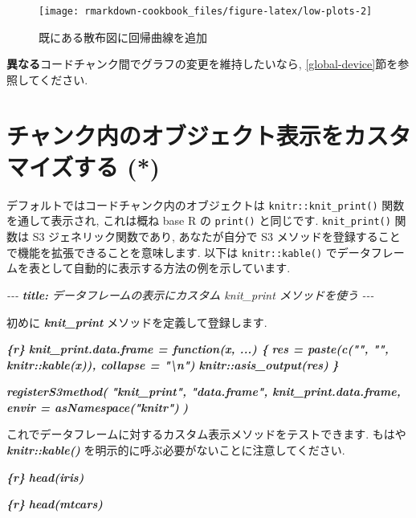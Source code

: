 \documentclass[
  11pt,
]{bxjsreport}
\newenvironment{Shaded}{\begin{snugshade}}{\end{snugshade}}
\newcommand{\AnnotationTok}[1]{\textcolor[rgb]{0.56,0.35,0.01}{\textbf{\textit{#1}}}}
\newcommand{\CommentTok}[1]{\textcolor[rgb]{0.56,0.35,0.01}{\textit{#1}}}
\newcommand{\InformationTok}[1]{\textcolor[rgb]{0.56,0.35,0.01}{\textbf{\textit{#1}}}}
\newcommand{\NormalTok}[1]{#1}
\begin{document}
\begin{figure}

{\centering \texttt{[image: rmarkdown-cookbook\_files/figure-latex/low-plots-2]} 

}

\caption{既にある散布図に回帰曲線を追加}\label{fig:low-plots-2}
\end{figure}

\textbf{異なる}コードチャンク間でグラフの変更を維持したいなら, \ref{global-device}節を参照してください.

\hypertarget{opts-render}{%
\section{チャンク内のオブジェクト表示をカスタマイズする (*)}\label{opts-render}}

デフォルトではコードチャンク内のオブジェクトは \texttt{knitr::knit\_print()} 関数を通して表示され, これは概ね base R の \texttt{print()} と同じです. \texttt{knit\_print()} 関数は S3 ジェネリック関数であり, あなたが自分で S3 メソッドを登録することで機能を拡張できることを意味します. 以下は \texttt{knitr::kable()} でデータフレームを表として自動的に表示する方法の例を示しています.

\begin{Shaded}
\begin{Highlighting}[]
\CommentTok{{-}{-}{-}}
\AnnotationTok{title:}\CommentTok{ データフレームの表示にカスタム \textasciigrave{}knit\_print\textasciigrave{} メソッドを使う}
\CommentTok{{-}{-}{-}}

\NormalTok{初めに }\InformationTok{\textasciigrave{}knit\_print\textasciigrave{}}\NormalTok{ メソッドを定義して登録します.}

\InformationTok{\textasciigrave{}\textasciigrave{}\textasciigrave{}\{r\}}
\InformationTok{knit\_print.data.frame = function(x, ...) \{}
\InformationTok{  res = paste(c("", "", knitr::kable(x)), collapse = "\textbackslash{}n")}
\InformationTok{  knitr::asis\_output(res)}
\InformationTok{\}}

\InformationTok{registerS3method(}
\InformationTok{  "knit\_print", "data.frame", knit\_print.data.frame,}
\InformationTok{  envir = asNamespace("knitr")}
\InformationTok{)}
\InformationTok{\textasciigrave{}\textasciigrave{}\textasciigrave{}}

\NormalTok{これでデータフレームに対するカスタム表示メソッドをテストできます. もはや }\InformationTok{\textasciigrave{}knitr::kable()\textasciigrave{}}\NormalTok{ を明示的に呼ぶ必要がないことに注意してください.}

\InformationTok{\textasciigrave{}\textasciigrave{}\textasciigrave{}\{r\}}
\InformationTok{head(iris)}
\InformationTok{\textasciigrave{}\textasciigrave{}\textasciigrave{}}

\InformationTok{\textasciigrave{}\textasciigrave{}\textasciigrave{}\{r\}}
\InformationTok{head(mtcars)}
\InformationTok{\textasciigrave{}\textasciigrave{}\textasciigrave{}}
\end{Highlighting}
\end{Shaded}
\end{document}
